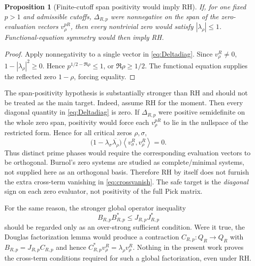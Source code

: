 \documentclass[11pt]{article}
\newtheorem{proposition}[theorem]{Proposition}
\theoremstyle{remark}
\newcommand{\ip}[2]{\left\langle #1,#2\right\rangle}
\begin{document}
\begin{proposition}[Finite-cutoff span positivity would imply RH]\label{prop:positivity}
If, for one fixed $p>1$ and admissible cutoffs, $\Delta_{R,p}$ were nonnegative on the span of the zero-evaluation vectors $v_\rho^{pR}$, then every nontrivial zero would satisfy $|\lambda_\rho|\le1$. Functional-equation symmetry would then imply RH.
\end{proposition}

\begin{proof}
Apply nonnegativity to a single vector in \eqref{eq:Deltadiag}. Since $v_\rho^R\ne0$,
$1-|\lambda_\rho|^2\ge0$. Hence $p^{1/2-\Re\rho}\le1$, or $\Re\rho\ge1/2$. The functional equation supplies the reflected zero $1-\rho$, forcing equality.
\end{proof}

The span-positivity hypothesis is substantially stronger than RH and should not be treated as the main target. Indeed, assume RH for the moment. Then every diagonal quantity in \eqref{eq:Deltadiag} is zero. If $\Delta_{R,p}$ were positive semidefinite on the whole zero span, positivity would force each $v_\rho^{pR}$ to lie in the nullspace of the restricted form. Hence for all critical zeros $\rho,\sigma$,
\begin{equation}\label{eq:crossvanish}
 \bigl(1-\lambda_\sigma\overline{\lambda_\rho}\bigr)
 \ip{v_\sigma^R}{v_\rho^R}=0.
\end{equation}
Thus distinct prime phases would require the corresponding evaluation vectors to be orthogonal. Burnol's zero systems are studied as complete/minimal systems, not supplied here as an orthogonal basis. Therefore RH by itself does not furnish the extra cross-term vanishing in \eqref{eq:crossvanish}. The safe target is the \emph{diagonal} sign on each zero evaluator, not positivity of the full Pick matrix.

For the same reason, the stronger global operator inequality
\begin{equation}\label{eq:globalpositive}
 B_{R,p}B_{R,p}^*\le J_{R,p}J_{R,p}^*
\end{equation}
should be regarded only as an over-strong sufficient condition. Were it true, the Douglas factorization lemma would produce a contraction $C_{R,p}:Q_R\to Q_R$ with $B_{R,p}=J_{R,p}C_{R,p}$ and hence $C_{R,p}^*v_\rho^R=\lambda_\rho v_\rho^R$. Nothing in the present work proves the cross-term conditions required for such a global factorization, even under RH.
\end{document}
